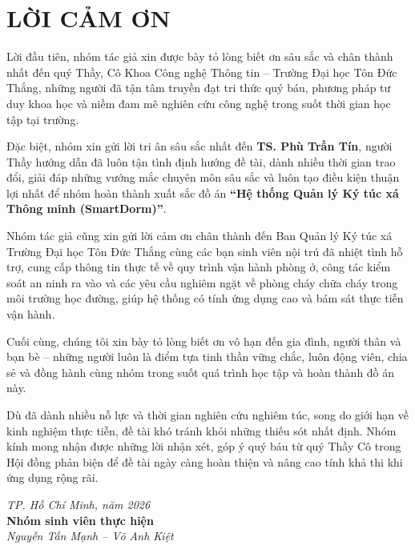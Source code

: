 \chapter*{LỜI CẢM ƠN}

Lời đầu tiên, nhóm tác giả xin được bày tỏ lòng biết ơn sâu sắc và chân thành nhất đến quý Thầy, Cô Khoa Công nghệ Thông tin – Trường Đại học Tôn Đức Thắng, những người đã tận tâm truyền đạt tri thức quý báu, phương pháp tư duy khoa học và niềm đam mê nghiên cứu công nghệ trong suốt thời gian học tập tại trường.

Đặc biệt, nhóm xin gửi lời tri ân sâu sắc nhất đến \textbf{TS. Phù Trần Tín}, người Thầy hướng dẫn đã luôn tận tình định hướng đề tài, dành nhiều thời gian trao đổi, giải đáp những vướng mắc chuyên môn sâu sắc và luôn tạo điều kiện thuận lợi nhất để nhóm hoàn thành xuất sắc đồ án \textbf{``Hệ thống Quản lý Ký túc xá Thông minh (SmartDorm)''}.

Nhóm tác giả cũng xin gửi lời cảm ơn chân thành đến Ban Quản lý Ký túc xá Trường Đại học Tôn Đức Thắng cùng các bạn sinh viên nội trú đã nhiệt tình hỗ trợ, cung cấp thông tin thực tế về quy trình vận hành phòng ở, công tác kiểm soát an ninh ra vào và các yêu cầu nghiêm ngặt về phòng cháy chữa cháy trong môi trường học đường, giúp hệ thống có tính ứng dụng cao và bám sát thực tiễn vận hành.

Cuối cùng, chúng tôi xin bày tỏ lòng biết ơn vô hạn đến gia đình, người thân và bạn bè – những người luôn là điểm tựa tinh thần vững chắc, luôn động viên, chia sẻ và đồng hành cùng nhóm trong suốt quá trình học tập và hoàn thành đồ án này.

Dù đã dành nhiều nỗ lực và thời gian nghiên cứu nghiêm túc, song do giới hạn về kinh nghiệm thực tiễn, đề tài khó tránh khỏi những thiếu sót nhất định. Nhóm kính mong nhận được những lời nhận xét, góp ý quý báu từ quý Thầy Cô trong Hội đồng phản biện để đề tài ngày càng hoàn thiện và nâng cao tính khả thi khi ứng dụng rộng rãi.

\vspace{1.5cm}
\begin{flushright}
    \textit{TP. Hồ Chí Minh, năm 2026}\\[0.3cm]
    \textbf{Nhóm sinh viên thực hiện}\\[0.2cm]
    \textit{Nguyễn Tấn Mạnh – Võ Anh Kiệt}
\end{flushright}
\newpage
